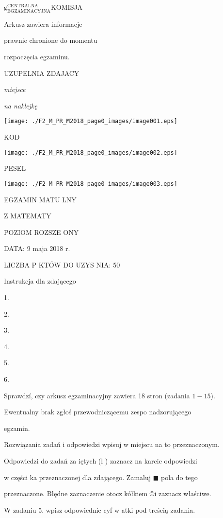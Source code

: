 \documentclass[a4paper,12pt]{article}
\begin{document}
$\mathrm{g}_{\mathrm{E}\mathrm{G}\mathrm{Z}\mathrm{A}\mathrm{M}\mathrm{I}\mathrm{N}\mathrm{A}\mathrm{C}\mathrm{Y}\mathrm{J}\mathrm{N}\mathrm{A}}^{\mathrm{C}\mathrm{E}\mathrm{N}\mathrm{T}\mathrm{R}\mathrm{A}\mathrm{L}\mathrm{N}\mathrm{A}}$KOMISJA

Arkusz zawiera informacje

prawnie chronione do momentu

rozpoczęcia egzaminu.

UZUPELNIA ZDAJACY

{\it miejsce}

{\it na naklejkę}
\begin{center}
\texttt{[image: ./F2\_M\_PR\_M2018\_page0\_images/image001.eps]}
\end{center}
KOD
\begin{center}
\texttt{[image: ./F2\_M\_PR\_M2018\_page0\_images/image002.eps]}
\end{center}
PESEL
\begin{center}
\texttt{[image: ./F2\_M\_PR\_M2018\_page0\_images/image003.eps]}
\end{center}
EGZAMIN MATU  LNY

Z MATEMATY

POZIOM ROZSZE ONY

DATA: 9 maja 2018 r.

LICZBA P KTÓW DO UZYS NIA: 50

Instrukcja dla zdającego

1.

2.

3.

4.

5.

6.

Sprawdzí, czy arkusz egzaminacyjny zawiera 18 stron (zadania $1-15$).

Ewentualny brak zgłoś przewodniczącemu zespo nadzorującego

egzamin.

Rozwiązania zadań i odpowiedzi wpisuj w miejscu na to przeznaczonym.

Odpowiedzi do zadań za iętych (l ) zaznacz na karcie odpowiedzi

w części ka przeznaczonej dla zdającego. Zamaluj $\blacksquare$ pola do tego

przeznaczone. Błędne zaznaczenie otocz kółkiem \copyright i zaznacz właściwe.

$\mathrm{W}$ zadaniu 5. wpisz odpowiednie cyf w atki pod treścią zadania.
\end{document}
